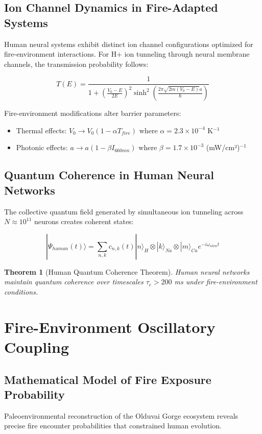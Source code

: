 \documentclass[11pt]{article}
\newtheorem{theorem}{Theorem}[section]
\theoremstyle{remark}
\begin{document}
\subsection{Ion Channel Dynamics in Fire-Adapted Systems}

Human neural systems exhibit distinct ion channel configurations optimized for fire-environment interactions. For H+ ion tunneling through neural membrane channels, the transmission probability follows:

$$T(E) = \frac{1}{1 + \left(\frac{V_0 - E}{2E}\right)^2 \sinh^2\left(\frac{2\pi\sqrt{2m(V_0 - E)}a}{\hbar}\right)}$$

Fire-environment modifications alter barrier parameters:
\begin{itemize}
\item Thermal effects: $V_0 \to V_0(1 - \alpha T_{fire})$ where $\alpha = 2.3 \times 10^{-4}$ K$^{-1}$
\item Photonic effects: $a \to a(1 - \beta I_{660nm})$ where $\beta = 1.7 \times 10^{-3}$ (mW/cm²)$^{-1}$
\end{itemize}

\subsection{Quantum Coherence in Human Neural Networks}

The collective quantum field generated by simultaneous ion tunneling across $N \approx 10^{11}$ neurons creates coherent states:

$$|\Psi_{human}(t)\rangle = \sum_{n,k} c_{n,k}(t) |n\rangle_H \otimes |k\rangle_{Na} \otimes |m\rangle_{Ca} e^{-i\omega_{nkm}t}$$

\begin{theorem}[Human Quantum Coherence Theorem]
Human neural networks maintain quantum coherence over timescales $\tau_c > 200$ ms under fire-environment conditions.
\end{theorem}

\section{Fire-Environment Oscillatory Coupling}

\subsection{Mathematical Model of Fire Exposure Probability}

Paleoenvironmental reconstruction of the Olduvai Gorge ecosystem reveals precise fire encounter probabilities that constrained human evolution.
\end{document}
